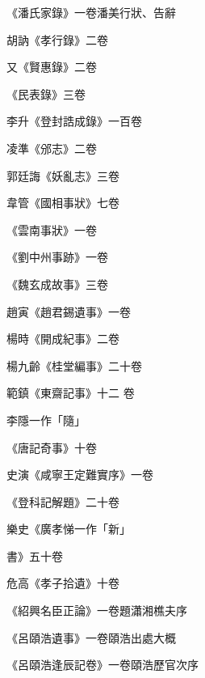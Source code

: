 \begin{pinyinscope}
 《潘氏家錄》一卷潘美行狀、告辭



 胡訥《孝行錄》二卷



 又《賢惠錄》二卷



 《民表錄》三卷



 李升《登封誥成錄》一百卷



 凌準《邠志》二卷



 郭廷誨《妖亂志》三卷



 韋管《國相事狀》七卷



 《雲南事狀》一卷



 《劉中州事跡》一卷



 《魏玄成故事》三卷



 趙寅《趙君錫遺事》一卷



 楊時《開成紀事》二卷



 楊九齡《桂堂編事》二十卷



 範鎮《東齋記事》十二
 卷



 李隱一作「隨」



 《唐記奇事》十卷



 史演《咸寧王定難實序》一卷



 《登科記解題》二十卷



 樂史《廣孝悌一作「新」



 書》五十卷



 危高《孝子拾遺》十卷



 《紹興名臣正論》一卷題瀟湘樵夫序



 《呂頤浩遺事》一卷頤浩出處大概



 《呂頤浩逢辰記卷》一卷頤浩歷官次序




\end{pinyinscope}
